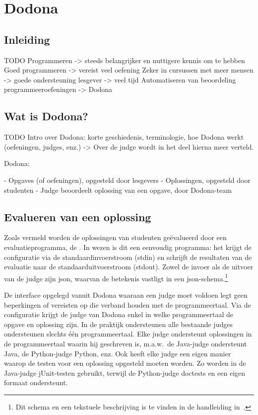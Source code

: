 \chapter{Dodona}\label{ch:dodona}

\section{Inleiding}\label{sec:inleiding}

TODO
Programmeren -> steeds belangrijker en nuttigere kennis om te hebben
Goed programmeren -> vereist veel oefening
Zeker in cursussen met meer mensen -> goede ondersteuning lesgever -> veel tijd
Automatiseren van beoordeling programmeeroefeningen -> Dodona

\section{Wat is Dodona?}\label{sec:wat-is-dodona}

TODO
Intro over Dodona: korte geschiedenis, terminologie, hoe Dodona werkt (oefeningen, judges, enz.)
-> Over de judge wordt in het deel hierna meer verteld.

Dodona:

- Opgaves (of oefeningen), opgesteld door lesgevers
- Oplossingen, opgesteld door studenten
- Judge beoordeelt oplossing van een opgave, door Dodona-team

\section{Evalueren van een oplossing}\label{sec:evalueren-van-een-oplossing}

Zoals vermeld worden de oplossingen van studenten geëvalueerd door een evaluatieprogramma, de .
In wezen is dit een eenvoudig programma: het krijgt de configuratie via de standaardinvoerstroom (stdin) en schrijft de resultaten van de evaluatie naar de standaarduitvoerstroom (stdout).
Zowel de invoer als de uitvoer van de judge zijn json, waarvan de betekenis vastligt in een json-schema.\footnote{Dit schema en een tekstuele beschrijving is te vinden in de handleiding in~\autocite{dodona2020}.}

De interface opgelegd vanuit Dodona waaraan een judge moet voldoen legt geen beperkingen of vereisten op die verband houden met de programmeertaal.
Via de configuratie krijgt de judge van Dodona enkel in welke programmeertaal de opgave en oplossing zijn.
In de praktijk ondersteunen alle bestaande judges ondersteunen slechts één programmeertaal.
Elke judge ondersteunt oplossingen in de programmeertaal waarin hij geschreven is, m.a.w.\ de Java-judge ondersteunt Java, de Python-judge Python, enz.
Ook heeft elke judge een eigen manier waarop de testen voor een oplossing opgesteld moeten worden.
Zo worden in de Java-judge jUnit-testen gebruikt, terwijl de Python-judge doctests en een eigen formaat ondersteunt.

